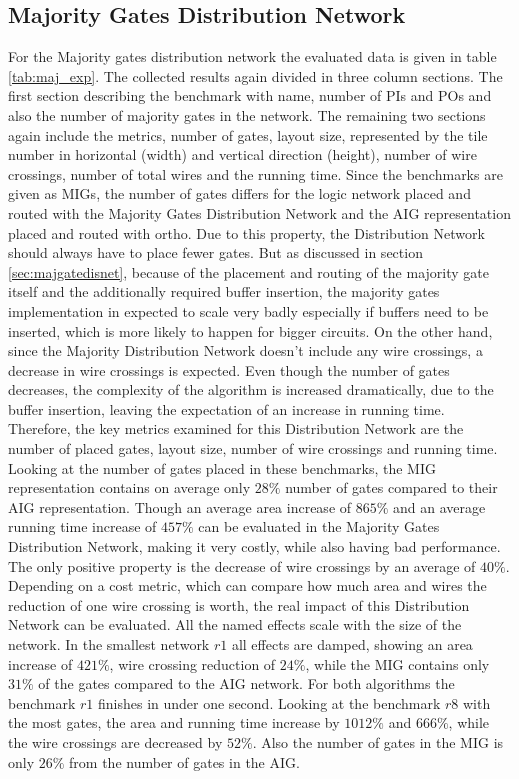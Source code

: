\newpage
\subsection{Majority Gates Distribution Network}
For the Majority gates distribution network the evaluated data is given in table \ref{tab:maj_exp}. The collected results again divided in three column sections. The first section describing the benchmark with name, number of PIs and POs and also the number of majority gates in the network. The remaining two sections again include the metrics, number of gates, layout size, represented by the tile number in horizontal (width) and vertical direction (height), number of wire crossings, number of total wires and the running time. Since the benchmarks are given as MIGs, the number of gates differs for the logic network placed and routed with the Majority Gates Distribution Network and the AIG representation placed and routed with ortho. 
Due to this property, the Distribution Network should always have to place fewer gates. But as discussed in section \ref{sec:majgatedisnet}, because of the placement and routing of the majority gate itself and the additionally required buffer insertion, the majority gates implementation in expected to scale very badly especially if buffers need to be inserted, which is more likely to happen for bigger circuits. On the other hand, since the Majority Distribution Network doesn't include any wire crossings, a decrease in wire crossings is expected. Even though the number of gates decreases, the complexity of the algorithm is increased dramatically, due to the buffer insertion, leaving the expectation of an increase in running time. Therefore, the key metrics examined for this Distribution Network are the number of placed gates, layout size, number of wire crossings and running time.
Looking at the number of gates placed in these benchmarks, the MIG representation contains on average only $28\%$ number of gates compared to their AIG representation. Though an average area increase of $865\%$ and an average running time increase of $457\%$ can be evaluated in the Majority Gates Distribution Network, making it very costly, while also having bad performance. The only positive property is the decrease of wire crossings by an average of $40\%$. Depending on a cost metric, which can compare how much area and wires the reduction of one wire crossing is worth, the real impact of this Distribution Network can be evaluated. All the named effects scale with the size of the network. In the smallest network $r1$ all effects are damped, showing an area increase of $421\%$, wire crossing reduction of $24\%$, while the MIG contains only $31\%$ of the gates compared to the AIG network. For both algorithms the benchmark $r1$ finishes in under one second. Looking at the benchmark $r8$ with the most gates, the area and running time increase by $1012\%$ and $666\%$, while the wire crossings are decreased by $52\%$. Also the number of gates in the MIG is only $26\%$ from the number of gates in the AIG.
